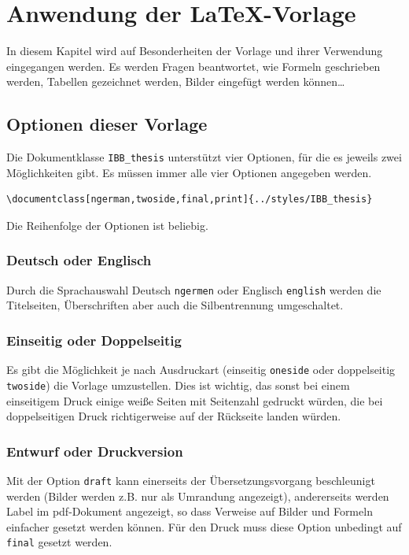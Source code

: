%
%
\chapter{Anwendung der \LaTeX-Vorlage} \label{beispiel_kapitel}
%
%
In diesem Kapitel wird auf Besonderheiten der Vorlage und ihrer Verwendung
eingegangen werden. Es werden Fragen beantwortet, wie Formeln geschrieben
werden, Tabellen gezeichnet werden, Bilder eingefügt werden können\ldots



\section{Optionen dieser Vorlage}

Die Dokumentklasse \verb+IBB_thesis+ unterstützt vier Optionen, für die
es jeweils zwei Möglichkeiten gibt. Es müssen immer alle vier Optionen angegeben werden.
\begin{verbatim}
\documentclass[ngerman,twoside,final,print]{../styles/IBB_thesis}
\end{verbatim}
Die Reihenfolge der Optionen ist beliebig.


\subsection{Deutsch oder Englisch}
Durch die Sprachauswahl Deutsch \verb+ngermen+ oder Englisch \verb+english+
werden die Titelseiten, Überschriften aber auch die Silbentrennung umgeschaltet.


\subsection{Einseitig oder Doppelseitig}
Es gibt die Möglichkeit je nach Ausdruckart (einseitig \verb+oneside+ oder
doppelseitig \verb+twoside+) die Vorlage umzustellen. Dies ist wichtig, das
sonst bei einem einseitigem Druck einige weiße Seiten mit Seitenzahl gedruckt würden,
die bei doppelseitigen Druck richtigerweise auf der Rückseite landen würden.


\subsection{Entwurf oder Druckversion}
Mit der Option \verb+draft+ kann einerseits der Übersetzungsvorgang beschleunigt
werden (Bilder werden z.B. nur als Umrandung angezeigt), andererseits werden
Label im pdf-Dokument angezeigt, so dass Verweise auf Bilder und Formeln
einfacher gesetzt werden können. Für den Druck muss diese Option unbedingt auf
\verb+final+ gesetzt werden.


